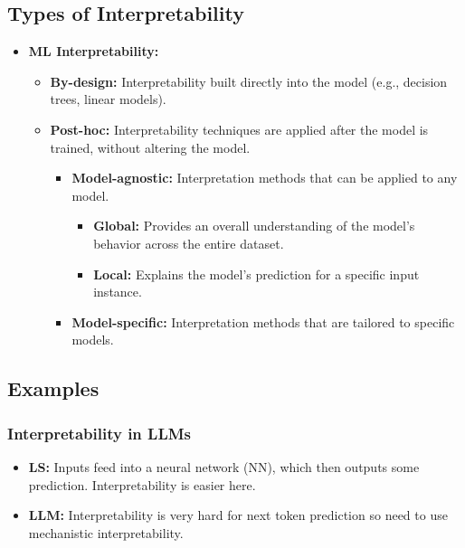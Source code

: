\subsection{Types of Interpretability}
\begin{summary}
    \begin{itemize}
        \item \textbf{ML Interpretability:} 
        \begin{itemize}
            \item \textbf{By-design:} Interpretability built directly into the model (e.g., decision trees, linear models).
            \item \textbf{Post-hoc:} Interpretability techniques are applied after the model is trained, without altering the model.
            \begin{itemize}
                \item \textbf{Model-agnostic:} Interpretation methods that can be applied to any model.
                \begin{itemize}
                    \item \textbf{Global:} Provides an overall understanding of the model’s behavior across the entire dataset.
                    \item \textbf{Local:} Explains the model’s prediction for a specific input instance.
                \end{itemize}
                \item \textbf{Model-specific:} Interpretation methods that are tailored to specific models.
            \end{itemize}
        \end{itemize}
    \end{itemize}    
\end{summary}
\newpage

\subsection{Examples}
\subsubsection{Interpretability in LLMs}
\begin{example}
    \begin{itemize}
        \item \textbf{LS:} Inputs feed into a neural network (NN), which then outputs some prediction. Interpretability is easier here.
        \item \textbf{LLM:} Interpretability is very hard for next token prediction so need to use mechanistic interpretability.
    \end{itemize}
\end{example}
